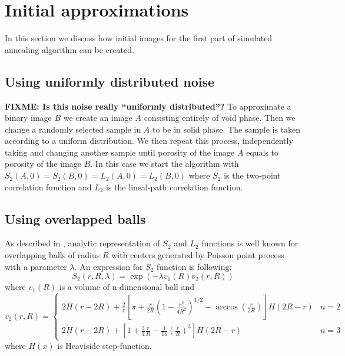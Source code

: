 \documentclass[preprint,amsmath,amssymb,aps,pre]{revtex4-1}
\begin{document}
\section{Initial approximations}
\label{sec:init}
In this section we discuss how initial images for the first part of simulated
annealing algorithm can be created.
\subsection{Using uniformly distributed noise}
\label{sec:init-uniform}
\textbf{FIXME: Is this noise really ``uniformly distributed''?}
To approximate a binary image $B$ we create an image $A$ consisting entirely of
void phase. Then we change a randomly selected sample in $A$ to be in solid
phase. The sample is taken according to a uniform distribution. We then repeat
this process, independently taking and changing another sample until porosity of
the image $A$ equals to porosity of the image $B$. In this case we start the
algorithm with $S_2(A, 0) = S_2(B, 0) = L_2(A, 0) = L_2(B, 0)$ where $S_2$ is
the two-point correlation function and $L_2$ is the lineal-path correlation
function.
\subsection{Using overlapped balls}
\label{sec:init-balls}
As described in \cite{Torq-book}, analytic representation of $S_2$ and $L_2$
functions is well known for overlapping balls of radius $R$ with centers
generated by Poisson point process with a parameter $\lambda$. An expression for
$S_2$ function is following:
\begin{equation}
  S_2(r, R, \lambda) = \exp(-\lambda v_1(R) v_2(r, R)) \label{eq:s2-balls}
\end{equation}
where $v_1(R)$ is a volume of n-dimensional ball and
\begin{equation*}
  v_2(r, R) =
  \begin{cases}
    2H(r - 2R) + \frac{2}{\pi}[\pi + \frac{r}{2R}(1 - \frac{r^2}{4R^2})^{1/2} -
      \arccos(\frac{r}{2R})]H(2R-r) & n = 2 \\
    2H(r - 2R) + [1 + \frac{3}{4}\frac{r}{R} - \frac{1}{16}(\frac{r}{R})^3]H(2R
    - r) & n = 3
  \end{cases}
\end{equation*}
where $H(x)$ is Heaviside step-function.
\end{document}
